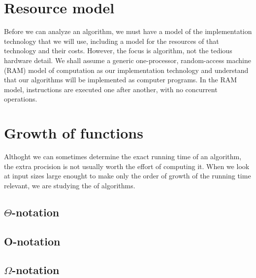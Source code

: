 \section{Resource model}


Before we can analyze an algorithm, we must have a model of the implementation technology that we will use, including a model for the resources of that technology and their costs. 
However, the focus is algorithm, not the tedious hardware detail.
We shall assume a generic one-processor, random-access machine (RAM) model of computation as our implementation technology and understand
that our algorithms will be implemented as computer programs.
In the RAM model, instructions are executed one after another, with no concurrent operations.



\section{Growth of functions}

Althoght we can sometimes determine the exact running time of an algorithm, the extra procision is not usually worth the effort of computing it.
When we look at input sizes large enought to make only the order of growth of the running time relevant, we are studying the  of algorithms.


\subsection{$\Theta$-notation}



\subsection{O-notation}

\subsection{$\Omega$-notation}


